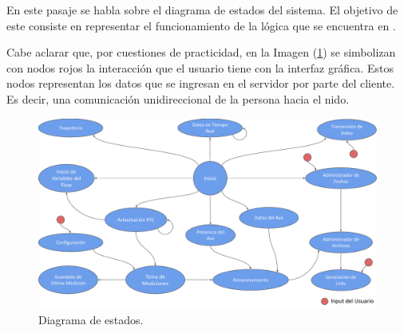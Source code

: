 En este pasaje se habla sobre el diagrama de estados del sistema. El objetivo de este consiste en representar el funcionamiento de la lógica que se encuentra en \nodered.

Cabe aclarar que, por cuestiones de practicidad, en la Imagen (\ref{fig:diagrama_de_estados}) se simbolizan con nodos rojos la interacción que el usuario tiene con la interfaz gráfica. Estos nodos representan los datos que se ingresan en el servidor por parte del cliente. Es decir, una comunicación unidireccional de la persona hacia el nido.

\begin{figure}[H]
	\centering	
	\includegraphics[width=\textwidth, page=1]{ImagenesIngenieria de Detalle/FlowChartNodeRed.pdf}	
	\caption{Diagrama de estados.}
	\label{fig:diagrama_de_estados}
\end{figure}
